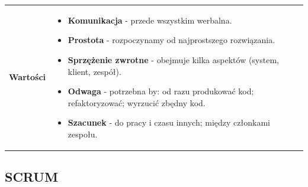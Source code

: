 \documentclass[a4paper]{article}
\begin{document}
    \begin{table}[H]
        \begin{center}
            \begin{tabular}{ p{2cm} p{14cm}}
                \textbf{Wartości}
                &
                \begin{itemize}
                    \item \textbf{Komunikacja} - przede wszystkim werbalna.
                    \item \textbf{Prostota} - rozpoczynamy od najprostszego rozwiązania.
                    \item \textbf{Sprzężenie zwrotne} - obejmuje kilka aspektów (system, klient, zespół).
                    \item \textbf{Odwaga} - potrzebna by: od razu produkować kod; refaktoryzować; wyrzucić zbędny kod.
                    \item \textbf{Szacunek} - do pracy i czasu innych; między członkami zespołu.
                \end{itemize}
            \end{tabular}
        \end{center}
    \end{table}

    \subsection{SCRUM}
\end{document}
